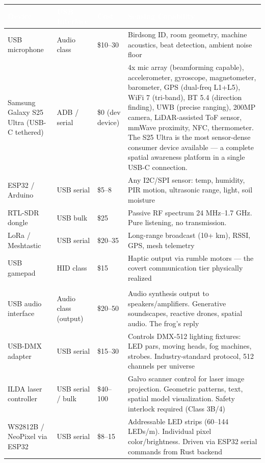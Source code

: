 \documentclass[11pt,letterpaper]{article}
\newcommand{\tableheader}[1]{\textbf{\sffamily\textcolor{white}{#1}}}
\begin{document}
\begin{center}
\begin{tabularx}{\textwidth}{L{3cm}L{2.5cm}L{2cm}X}
\toprule
{}
\tableheader{Device} & \tableheader{USB Interface} & \tableheader{Cost} & \tableheader{Sensing Capability} \\
\midrule
USB microphone & Audio class & \$10--30 & Birdsong ID, room geometry, machine acoustics, beat detection, ambient noise floor \\
Samsung Galaxy S25 Ultra (USB-C tethered) & ADB / serial & \$0 (dev device) & 4x mic array (beamforming capable), accelerometer, gyroscope, magnetometer, barometer, GPS (dual-freq L1+L5), WiFi 7 (tri-band), BT 5.4 (direction finding), UWB (precise ranging), 200MP camera, LiDAR-assisted ToF sensor, mmWave proximity, NFC, thermometer. The S25 Ultra is the most sensor-dense consumer device available --- a complete spatial awareness platform in a single USB-C connection. \\
ESP32 / Arduino & USB serial & \$5--8 & Any I2C/SPI sensor: temp, humidity, PIR motion, ultrasonic range, light, soil moisture \\
RTL-SDR dongle & USB bulk & \$25 & Passive RF spectrum 24 MHz--1.7 GHz. Pure listening, no transmission. \\
LoRa / Meshtastic & USB serial & \$20--35 & Long-range broadcast (10+ km), RSSI, GPS, mesh telemetry \\
USB gamepad & HID class & \$15 & Haptic output via rumble motors --- the covert communication tier physically realized \\
\midrule
{}
 \\
\midrule
USB audio interface & Audio class (output) & \$20--50 & Audio synthesis output to speakers/amplifiers. Generative soundscapes, reactive drones, spatial audio. The frog's reply \\
USB-DMX adapter & USB serial & \$15--30 & Controls DMX-512 lighting fixtures: LED pars, moving heads, fog machines, strobes. Industry-standard protocol, 512 channels per universe \\
ILDA laser controller & USB serial / bulk & \$40--100 & Galvo scanner control for laser image projection. Geometric patterns, text, spatial model visualization. Safety interlock required (Class 3B/4) \\
WS2812B / NeoPixel via ESP32 & USB serial & \$8--15 & Addressable LED strips (60--144 LEDs/m). Individual pixel color/brightness. Driven via ESP32 serial commands from Rust backend \\
\bottomrule
\end{tabularx}
\end{center}
\end{document}
